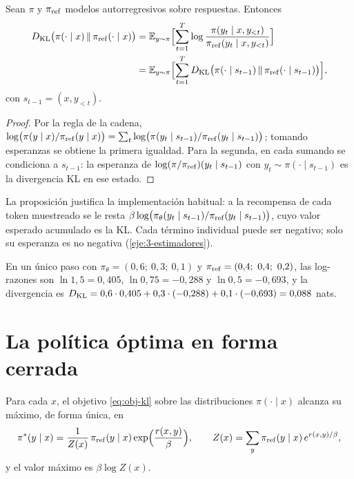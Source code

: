 \begin{proposicion}\label{prop:kl-tokens}
Sean $\pi$ y $\pi_{\mathrm{ref}}$ modelos autorregresivos sobre respuestas. Entonces
\[
\begin{aligned}
D_{\mathrm{KL}}\bigl(\pi(\cdot\mid x)\,\|\,\pi_{\mathrm{ref}}(\cdot\mid x)\bigr)&=\mathbb{E}_{y\sim\pi}\Bigl[\sum_{t=1}^{T}\log\frac{\pi(y_t\mid x,y_{<t})}{\pi_{\mathrm{ref}}(y_t\mid x,y_{<t})}\Bigr]\\
&=\mathbb{E}_{y\sim\pi}\Bigl[\sum_{t=1}^{T}D_{\mathrm{KL}}\bigl(\pi(\cdot\mid s_{t-1})\,\|\,\pi_{\mathrm{ref}}(\cdot\mid s_{t-1})\bigr)\Bigr],
\end{aligned}
\]
con $s_{t-1}=(x,y_{<t})$.
\end{proposicion}

\begin{proof}
Por la regla de la cadena, $\log\bigl(\pi(y\mid x)/\pi_{\mathrm{ref}}(y\mid x)\bigr)=\sum_t\log\bigl(\pi(y_t\mid s_{t-1})/\pi_{\mathrm{ref}}(y_t\mid s_{t-1})\bigr)$; tomando esperanzas se obtiene la primera igualdad. Para la segunda, en cada sumando se condiciona a $s_{t-1}$: la esperanza de $\log(\pi/\pi_{\mathrm{ref}})(y_t\mid s_{t-1})$ con $y_t\sim\pi(\cdot\mid s_{t-1})$ es la divergencia KL en ese estado.
\end{proof}

La proposición justifica la implementación habitual: a la recompensa de cada token muestreado se le resta $\beta\log\bigl(\pi_\theta(y_t\mid s_{t-1})/\pi_{\mathrm{ref}}(y_t\mid s_{t-1})\bigr)$, cuyo valor esperado acumulado es la KL. Cada término individual puede ser negativo; solo su esperanza es no negativa (\cref{eje:3-estimadores}).

\begin{ejemplo}\label{ej:kl}
En un único paso con $\pi_\theta=(0{,}6;\ 0{,}3;\ 0{,}1)$ y $\pi_{\mathrm{ref}}=(0{,}4;\ 0{,}4;\ 0{,}2)$, las log-razones son $\ln 1{,}5=0{,}405$, $\ln 0{,}75=-0{,}288$ y $\ln 0{,}5=-0{,}693$, y la divergencia es
$D_{\mathrm{KL}}=0{,}6\cdot 0{,}405+0{,}3\cdot(-0{,}288)+0{,}1\cdot(-0{,}693)=0{,}088$ nats.
\end{ejemplo}

\section{La política óptima en forma cerrada}

\begin{teorema}\label{teo:optimo-kl}
Para cada $x$, el objetivo \eqref{eq:obj-kl} sobre las distribuciones $\pi(\cdot\mid x)$ alcanza su máximo, de forma única, en
\[
\pi^{*}(y\mid x)=\frac{1}{Z(x)}\,\pi_{\mathrm{ref}}(y\mid x)\exp\Bigl(\frac{r(x,y)}{\beta}\Bigr),\qquad Z(x)=\sum_{y}\pi_{\mathrm{ref}}(y\mid x)\,e^{r(x,y)/\beta},
\]
y el valor máximo es $\beta\log Z(x)$.
\end{teorema}

